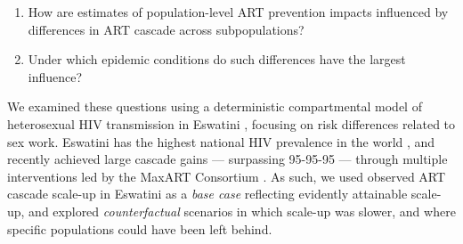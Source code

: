 \begin{enumerate}
  \item\label{obj:art.1} How are estimates of population-level ART prevention impacts
    influenced by differences in ART cascade across subpopulations?
  \item\label{obj:art.2} Under which epidemic conditions
    do such differences have the largest influence?
\end{enumerate}
We examined these questions using
a deterministic compartmental model of heterosexual HIV transmission in Eswatini \cite{Knight2019},
focusing on risk differences related to sex work.
Eswatini has the highest national HIV prevalence in the world \cite{UNAIDS2021},
and recently achieved large cascade gains --- surpassing 95-95-95 ---
through multiple interventions led by the MaxART Consortium \cite{Walsh2020,SHIMS3,AIDSinfo}.
As such, we used observed ART cascade scale-up in Eswatini as a \emph{base case}
reflecting evidently attainable scale-up,
and explored \emph{counterfactual} scenarios in which scale-up was slower,
and where specific populations could have been left behind.
